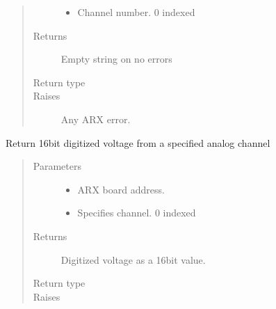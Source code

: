 \documentclass[letterpaper,10pt,english]{sphinxmanual}
\begin{document}
\begin{fulllineitems}
\begin{fulllineitems}
\begin{quote}
\begin{description}
\begin{itemize}
\item {} 
 \textendash{} Channel number. 0 indexed

\end{itemize}

\item[{Returns}] \leavevmode
Empty string on no errors

\item[{Return type}] \leavevmode
{}

\item[{Raises}] \leavevmode
{} \textendash{} Any ARX error.

\end{description}\end{quote}

\end{fulllineitems}


\begin{fulllineitems}
\label{\detokenize{index:lwautils.lwa_arx.ARX.get_chan_voltage}}
Return 16bit digitized voltage from a specified analog channel
\begin{quote}\begin{description}
\item[{Parameters}] \leavevmode\begin{itemize}
\item {} 
 \textendash{} ARX board address.

\item {} 
 \textendash{} Specifies channel. 0 indexed

\end{itemize}

\item[{Returns}] \leavevmode
Digitized voltage as a 16bit value.

\item[{Return type}] \leavevmode
{}

\item[{Raises}] \leavevmode
{} \textendash{} 


\end{description}
\end{quote}
\end{fulllineitems}
\end{fulllineitems}
\end{document}
